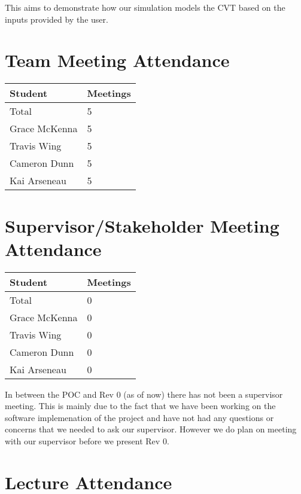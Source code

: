\documentclass{article}
\begin{document}
This aims to demonstrate how our simulation models the CVT based on the inputs provided by the user.

\section{Team Meeting Attendance}



\begin{table}[H]
\centering
\begin{tabular}{ll}
\toprule
\textbf{Student} & \textbf{Meetings}\\
\midrule
Total & 5\\
Grace McKenna & 5\\
Travis Wing & 5\\
Cameron Dunn & 5\\
Kai Arseneau & 5\\
\bottomrule
\end{tabular}
\end{table}


\section{Supervisor/Stakeholder Meeting Attendance}

\begin{table}[H]
\centering
\begin{tabular}{ll}
\toprule
\textbf{Student} & \textbf{Meetings}\\
\midrule
Total & 0\\
Grace McKenna & 0\\
Travis Wing & 0\\
Cameron Dunn & 0\\
Kai Arseneau & 0\\
\bottomrule
\end{tabular}
\end{table}

In between the POC and Rev 0 (as of now) there has not been a supervisor meeting. This is mainly due to the fact
that we have been working on the software implemenation of the project and have not had any questions or concerns that we needed to ask our supervisor.
However we do plan on meeting with our supervisor before we present Rev 0.


\section{Lecture Attendance}
\end{document}

